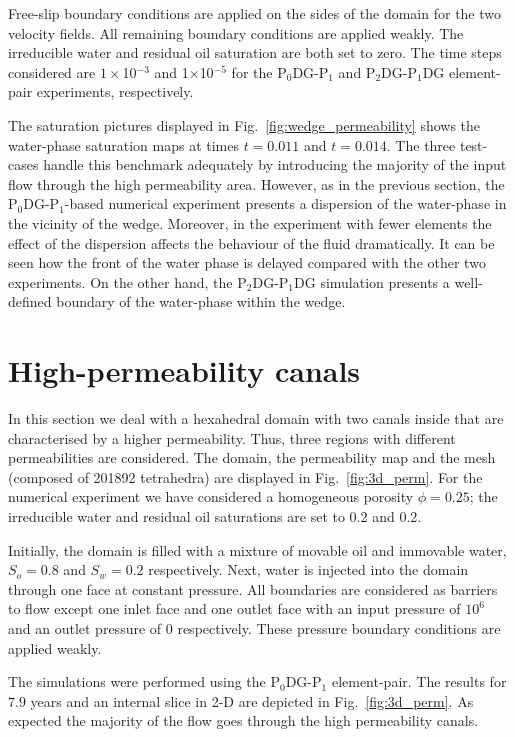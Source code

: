 \documentclass[preprint,authoryear,12pt]{elsarticle}
\newcommand{\PN}[2][error]{P$_{#1}$DG-P$_{#2}$}
\begin{document}
Free-slip boundary conditions are applied on the sides of the domain
for the two velocity fields. All remaining boundary conditions are
applied weakly. The irreducible water and residual oil saturation are
both set to zero. The time steps considered are $1\times$10$^{-3}$ and
1$\times$10$^{-5}$ for the \PN[0]{1} and \PN[2]{1}DG element-pair
experiments, respectively.


The saturation pictures displayed in Fig.~\ref{fig:wedge_permeability}
shows the water-phase saturation maps at times $t=0.011$ and
$t=0.014.$ The three test-cases handle this benchmark adequately by
introducing the majority of the input flow through the high
permeability area. However, as in the previous section, the
\PN[0]{1}-based numerical experiment presents a dispersion of the
water-phase in the vicinity of the wedge. Moreover, in the experiment
with fewer elements the effect of the dispersion affects the behaviour
of the fluid dramatically.  It can be seen how the front of the water
phase is delayed compared with the other two experiments. On the other
hand, the \PN[2]{1}DG simulation presents a well-defined boundary of
the water-phase within the wedge.

\section{High-permeability canals}\label{res5}
In this section we deal with a hexahedral domain with two canals
inside that are characterised by a higher permeability. Thus, three
regions with different permeabilities are considered. The domain, the
permeability map and the mesh (composed of 201892 tetrahedra) are
displayed in Fig.~\ref{fig:3d_perm}. For the numerical experiment we
have considered a homogeneous porosity $\phi=0.25$; the irreducible
water and residual oil saturations are set to 0.2 and 0.2.

Initially, the domain is filled with a mixture of movable oil and
immovable water, $S_o=0.8$ and $S_w=0.2$ respectively. Next, water is
injected into the domain through one face at constant pressure. All
boundaries are considered as barriers to flow except one inlet face
and one outlet face with an input pressure of $10^6$ and an outlet
pressure of $0$ respectively. These pressure boundary conditions are
applied weakly.

The simulations were performed using the \PN[0]{1} element-pair. The
results for $7.9$ years and an internal slice in 2-D are depicted in
Fig.~\ref{fig:3d_perm}. As expected the majority of the flow goes
through the high permeability canals.
\end{document}
